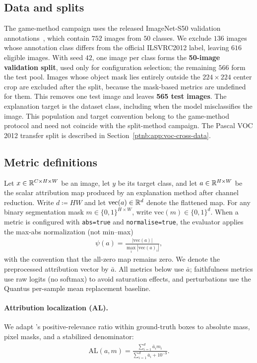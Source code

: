 \subsection{Data and splits}

The game-method campaign uses the released ImageNet-S50 validation annotations~\parencite{gao2022luss},
which contain $752$ images from $50$ classes. We exclude $136$ images whose annotation class
differs from the official ILSVRC2012 label, leaving $616$ eligible images. With seed $42$, one
image per class forms the \textbf{50-image validation split}, used only for configuration
selection; the remaining $566$ form the test pool. Images whose object mask lies entirely outside
the $224{\times}224$ center crop are excluded after the split, because the mask-based metrics are
undefined for them. This removes one test image and leaves \textbf{565 test images}. The
explanation target is the dataset class, including when the model misclassifies the image. This
population and target convention belong to the game-method protocol and need not coincide with
the split-method campaign. The Pascal VOC 2012 transfer split is described in
Section~\ref{ptnb:app:voc-cross-data}.

\subsection{Metric definitions}\label{ptnb:app:metrics}\label{app:metrics}

Let $x \in \mathbb{R}^{C \times H \times W}$ be an image, let $y$ be its target class, and let $a \in
    \mathbb{R}^{H \times W}$ be the scalar attribution map produced by an explanation method after channel
reduction. Write $d \coloneqq HW$ and let $\text{vec}(a) \in \mathbb{R}^d$ denote the flattened map. For
any binary segmentation mask $m \in \{0,1\}^{H \times W}$, write $\text{vec}(m) \in \{0,1\}^d$.
When a metric is configured with \texttt{abs=true} and \texttt{normalise=true}, the evaluator
applies the max-abs normalization (not min--max)
\begin{align}
    \psi(a) = \frac{|\text{vec}(a)|}{\max_i |\text{vec}(a)_i|},
\end{align}
with the convention that the all-zero map remains zero. We denote the preprocessed attribution
vector by $\bar{a}$. All metrics below use $\bar{a}$; faithfulness metrics use raw logits (no
softmax) to avoid saturation effects, and perturbations use the Quantus per-sample mean replacement
baseline.

\paragraph{Attribution localization (AL).} We adapt \textcite{Kohlbrenner2020}'s positive-relevance ratio within ground-truth boxes to absolute mass, pixel masks, and a stabilized denominator:
\begin{align}
    \text{AL}(a, m) = \frac{\sum_{i=1}^d \bar{a}_i m_i}{\sum_{i=1}^d \bar{a}_i + 10^{-9}}.
\end{align}

